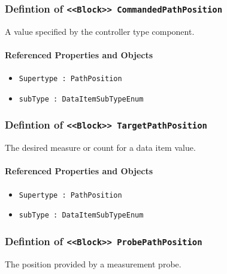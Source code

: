 \subsubsection{Defintion of \texttt{<<Block>> CommandedPathPosition}}
  \label{type:CommandedPathPosition}

\FloatBarrier

A value specified by the controller type component.

\FloatBarrier
\paragraph{Referenced Properties and Objects}

\begin{itemize}
\item \texttt{Supertype : PathPosition}

\item \texttt{subType : DataItemSubTypeEnum}

\end{itemize}
\FloatBarrier
\subsubsection{Defintion of \texttt{<<Block>> TargetPathPosition}}
  \label{type:TargetPathPosition}

\FloatBarrier

The desired measure or count for a data item value.

\FloatBarrier
\paragraph{Referenced Properties and Objects}

\begin{itemize}
\item \texttt{Supertype : PathPosition}

\item \texttt{subType : DataItemSubTypeEnum}

\end{itemize}
\FloatBarrier
\subsubsection{Defintion of \texttt{<<Block>> ProbePathPosition}}
  \label{type:ProbePathPosition}

\FloatBarrier

The position provided by a measurement probe.

